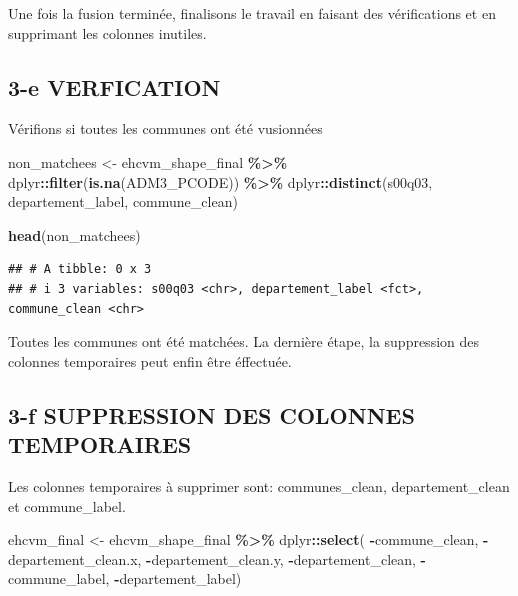 \documentclass[
]{article}
\newenvironment{Shaded}{\begin{snugshade}}{\end{snugshade}}
\newcommand{\FunctionTok}[1]{\textcolor[rgb]{0.13,0.29,0.53}{\textbf{#1}}}
\newcommand{\NormalTok}[1]{#1}
\newcommand{\OtherTok}[1]{\textcolor[rgb]{0.56,0.35,0.01}{#1}}
\newcommand{\SpecialCharTok}[1]{\textcolor[rgb]{0.81,0.36,0.00}{\textbf{#1}}}
\begin{document}
Une fois la fusion terminée, finalisons le travail en faisant des
vérifications et en supprimant les colonnes inutiles.

\subsection{3-e VERFICATION}\label{e-verfication}

Vérifions si toutes les communes ont été vusionnées

\begin{Shaded}
\begin{Highlighting}[]
\NormalTok{non\_matchees }\OtherTok{\textless{}{-}}\NormalTok{ ehcvm\_shape\_final }\SpecialCharTok{\%\textgreater{}\%}
\NormalTok{  dplyr}\SpecialCharTok{::}\FunctionTok{filter}\NormalTok{(}\FunctionTok{is.na}\NormalTok{(ADM3\_PCODE)) }\SpecialCharTok{\%\textgreater{}\%}
\NormalTok{  dplyr}\SpecialCharTok{::}\FunctionTok{distinct}\NormalTok{(s00q03, departement\_label, commune\_clean)}

\FunctionTok{head}\NormalTok{(non\_matchees)}
\end{Highlighting}
\end{Shaded}

\begin{verbatim}
## # A tibble: 0 x 3
## # i 3 variables: s00q03 <chr>, departement_label <fct>, commune_clean <chr>
\end{verbatim}

Toutes les communes ont été matchées. La dernière étape, la suppression
des colonnes temporaires peut enfin être éffectuée.

\subsection{3-f SUPPRESSION DES COLONNES
TEMPORAIRES}\label{f-suppression-des-colonnes-temporaires}

Les colonnes temporaires à supprimer sont: communes\_clean,
departement\_clean et commune\_label.

\begin{Shaded}
\begin{Highlighting}[]
\NormalTok{ehcvm\_final }\OtherTok{\textless{}{-}}\NormalTok{ ehcvm\_shape\_final }\SpecialCharTok{\%\textgreater{}\%}
\NormalTok{  dplyr}\SpecialCharTok{::}\FunctionTok{select}\NormalTok{(}
    \SpecialCharTok{{-}}\NormalTok{commune\_clean, }\SpecialCharTok{{-}}\NormalTok{departement\_clean.x, }\SpecialCharTok{{-}}\NormalTok{departement\_clean.y, }
    \SpecialCharTok{{-}}\NormalTok{departement\_clean, }\SpecialCharTok{{-}}\NormalTok{commune\_label, }\SpecialCharTok{{-}}\NormalTok{departement\_label)}
\end{Highlighting}
\end{Shaded}
\end{document}
